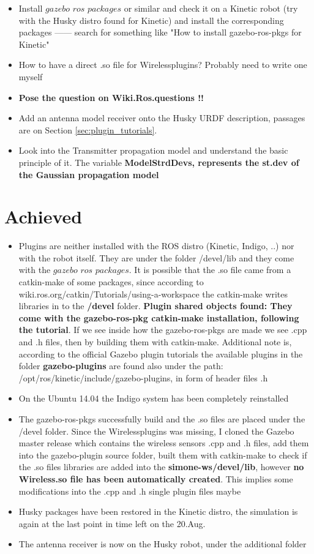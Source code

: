 \documentclass[11pt,a4paper]{article}
\begin{document}
\begin{itemize}
\item Install $gazebo$ $ros$ $packages$ or similar and check it on a Kinetic robot (try with the Husky distro found for Kinetic) and install the corresponding packages ------ search for something like "How to install gazebo-ros-pkgs for Kinetic"
\item How to have a direct .so file for Wirelessplugins? Probably need to write one myself
\item \textbf{Pose the question on Wiki.Ros.questions !!}
\item Add an antenna model receiver onto the Husky URDF description, passages are on Section \ref{sec:plugin_tutorials}.
\item Look into the Transmitter propagation model and understand the basic principle of it. The variable \textbf{ModelStrdDevs, represents the st.dev of the Gaussian propagation model}
\end{itemize}

\section{Achieved}

\begin{itemize}
\item Plugins are neither installed with the ROS distro (Kinetic, Indigo, ..) nor with the robot itself. They are under the folder /devel/lib and they come with the $gazebo$ $ros$ $packages$. It is possible that the .so file came from a catkin-make of some packages, since according to wiki.ros.org/catkin/Tutorials/using-a-workspace the catkin-make writes libraries in to the \textbf{/devel} folder. \textbf{Plugin shared objects found: They come with the gazebo-ros-pkg catkin-make installation, following the tutorial}. If we see inside how the gazebo-ros-pkgs are made we see .cpp and .h files, then by building them with catkin-make. Additional note is, according to the official Gazebo plugin tutorials the available plugins in the folder \textbf{gazebo-plugins} are found also under the path: /opt/ros/kinetic/include/gazebo-plugins, in form of header files .h
\item On the Ubuntu 14.04 the Indigo system has been completely reinstalled
\item The gazebo-ros-pkgs successfully build and the .so files are placed under the /devel folder. Since the Wirelessplugins was missing, I cloned the Gazebo master release which contains the wireless sensors .cpp and .h files, add them into the gazebo-plugin source folder, built them with catkin-make to check if the .so files libraries are added into the \textbf{simone-ws/devel/lib}, however \textbf{no Wireless.so file has been automatically created}. This implies some modifications into the .cpp and .h single plugin files maybe
\item Husky packages have been restored in the Kinetic distro, the simulation is again at the last point in time left on the 20.Aug.
\item  The antenna receiver is now on the Husky robot, under the additional folder
\end{itemize}
\end{document}

